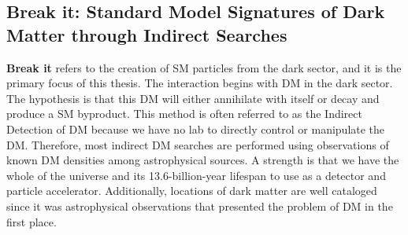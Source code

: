 \begin{figure}[h]
\end{figure}

\subsection{Break it: Standard Model Signatures of Dark Matter through Indirect Searches\label{sec:break_it}}

\textbf{Break it} refers to the creation of SM particles from the dark sector, and it is the primary focus of this thesis.
The interaction begins with DM in the dark sector.
The hypothesis is that this DM will either annihilate with itself or decay and produce a SM byproduct.
This method is often referred to as the Indirect Detection of DM because we have no lab to directly control or manipulate the DM.
Therefore, most indirect DM searches are performed using observations of known DM densities among astrophysical sources.
A strength is that we have the whole of the universe and its 13.6-billion-year lifespan to use as a detector and particle accelerator.
Additionally, locations of dark matter are well cataloged since it was astrophysical observations that presented the problem of DM in the first place.

